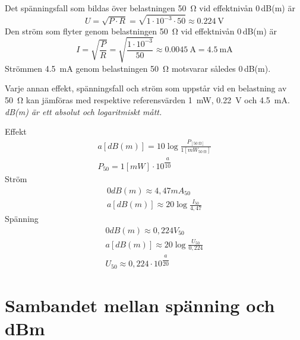 Det spänningsfall som bildas över belastningen \SI{50}{\ohm} vid effektnivån
0\,dB(m) är
\[U = \sqrt{P\cdot R} = \sqrt{1\cdot 10^{-3} \cdot 50} \approx \SI{0,224}{\volt}\]
Den ström som flyter genom belastningen \SI{50}{\ohm} vid effektnivån 0\,dB(m)
är
\[
I = \sqrt{\frac{P}{R}} = \sqrt{\frac{1\cdot 10^{-3}}{50}} \approx \SI{0,0045}{\ampere} = \SI{4,5}{\milli\ampere}
\]
Strömmen \SI{4,5}{\milli\ampere} genom belastningen \SI{50}{\ohm} motsvarar
således 0\,dB(m).

Varje annan effekt, spänningsfall och ström som uppstår vid en belastning av
\SI{50}{\ohm} kan jämföras med respektive referensvärden \SI{1}{\milli\watt},
\SI{0,22}{\volt} och \SI{4,5}{\milli\ampere}.
\emph{dB(m) är ett absolut och logaritmiskt mått.}

\vspace*{1ex}
\noindent
Effekt
\begin{gather*}
	a [dB(m)] = 10 \log\frac{P_{[\SI{50}{\ohm}]}}{1[mW_{\SI{50}{\ohm}}]} \\
	P_{50} = 1 [mW] \cdot 10^{\dfrac{a}{10}}
\end{gather*}
Ström
\begin{gather*}
	0 dB(m) \approx 4,47 mA_{50} \\
	a [dB(m)] \approx 20 \log\frac{I_{50}}{4,47}
\end{gather*}
Spänning
\begin{gather*}
	0 dB(m) \approx 0,224 V_{50} \\
	a [dB(m)] \approx 20 \log\frac{U_{50}}{0,224} \\
	U_{50} \approx 0,224 \cdot 10^{\dfrac{a}{20}}
\end{gather*}

\section[Sambandet spänning och dBm]{Sambandet mellan spänning och dBm}

